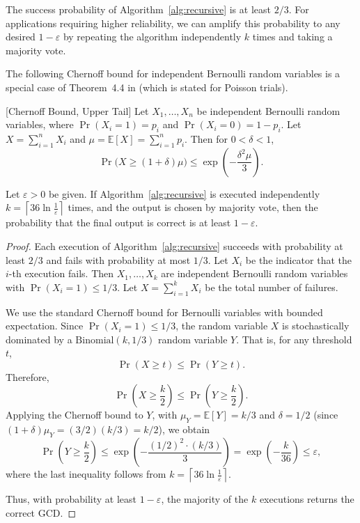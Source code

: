 \documentclass{article}
\numberwithin{equation}{section}
\begin{document}
The success probability of Algorithm~\ref{alg:recursive} is at least \(2/3\). For applications requiring higher reliability, we can amplify this probability to any desired \(1-\varepsilon\) by repeating the algorithm independently \(k\) times and taking a majority vote.



The following Chernoff bound for independent Bernoulli random variables is a special case of Theorem~4.4 in \cite{MitzenmacherUpfal2017} (which is stated for Poisson trials).


\begin{lemma}\cite{MitzenmacherUpfal2017}[Chernoff Bound, Upper Tail]\label{thm:chernoff-upper}
Let \(X_1, \dots, X_n\) be independent Bernoulli random variables, where \(\Pr(X_i = 1) = p_i\) and \(\Pr(X_i = 0) = 1 - p_i\). Let \(X = \sum_{i=1}^n X_i\) and \(\mu = \mathbb{E}[X] = \sum_{i=1}^n p_i\). Then for \(0 < \delta < 1\),
\[
\Pr\bigl(X \ge (1 + \delta)\mu\bigr) \le \exp\left(-\frac{\delta^2 \mu}{3}\right).
\]
\end{lemma}


\begin{lemma}\label{lem:amplify}
Let $\varepsilon > 0$ be given. If Algorithm~\ref{alg:recursive} is executed independently
%
$k = \left\lceil 36 \ln \frac{1}{\varepsilon} \right\rceil$
%
times, and the output is chosen by majority vote, then the probability that the final output is correct is at least \(1 - \varepsilon\).
\end{lemma}

\begin{proof}
Each execution of Algorithm~\ref{alg:recursive} succeeds with probability at least \(2/3\) and fails with probability at most \(1/3\). Let \(X_i\) be the indicator that the \(i\)-th execution fails. Then \(X_1,\dots,X_k\) are independent Bernoulli random variables with \(\Pr(X_i = 1) \le 1/3\). Let \(X = \sum_{i=1}^k X_i\) be the total number of failures.

We use the standard Chernoff bound for Bernoulli variables with bounded expectation. Since \(\Pr(X_i = 1) \le 1/3\), the random variable \(X\) is stochastically dominated by a \(\mathrm{Binomial}(k, 1/3)\) random variable \(Y\). That is, for any threshold \(t\),
\[
\Pr(X \ge t) \le \Pr(Y \ge t).
\]
Therefore,
\[
\Pr\left(X \ge \frac{k}{2}\right)
\le \Pr\left(Y \ge \frac{k}{2}\right).
\]
Applying the Chernoff bound to \(Y\), with \(\mu_Y = \mathbb{E}[Y] = k/3\) and \(\delta = 1/2\) (since \((1+\delta)\mu_Y = (3/2)(k/3) = k/2\)), we obtain
\[
\Pr\left(Y \ge \frac{k}{2}\right)
\le \exp\left(-\frac{(1/2)^2 \cdot (k/3)}{3}\right)
= \exp\left(-\frac{k}{36}\right)
\le \varepsilon,
\]
where the last inequality follows from \(k = \left\lceil 36 \ln\frac{1}{\varepsilon} \right\rceil\).

Thus, with probability at least \(1-\varepsilon\), the majority of the \(k\) executions returns the correct GCD.
\end{proof}
\end{document}
